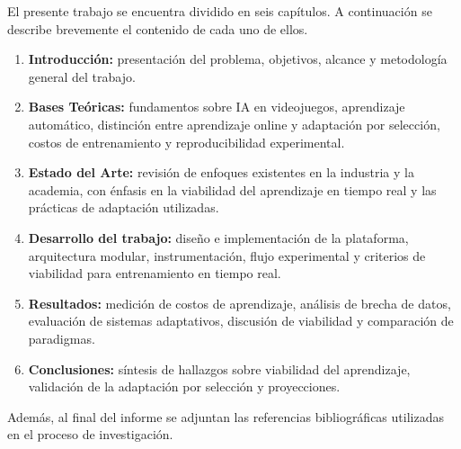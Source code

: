 El presente trabajo se encuentra dividido en seis capítulos. A continuación se describe brevemente el contenido de cada uno de ellos.

\begin{enumerate}
    \item \textbf{Introducción:} presentación del problema, objetivos, alcance y metodología general del trabajo.
    \item \textbf{Bases Teóricas:} fundamentos sobre IA en videojuegos, aprendizaje automático, distinción entre aprendizaje online y adaptación por selección, costos de entrenamiento y reproducibilidad experimental.
    \item \textbf{Estado del Arte:} revisión de enfoques existentes en la industria y la academia, con énfasis en la viabilidad del aprendizaje en tiempo real y las prácticas de adaptación utilizadas.
    \item \textbf{Desarrollo del trabajo:} diseño e implementación de la plataforma, arquitectura modular, instrumentación, flujo experimental y criterios de viabilidad para entrenamiento en tiempo real.
    \item \textbf{Resultados:} medición de costos de aprendizaje, análisis de brecha de datos, evaluación de sistemas adaptativos, discusión de viabilidad y comparación de paradigmas.
    \item \textbf{Conclusiones:} síntesis de hallazgos sobre viabilidad del aprendizaje, validación de la adaptación por selección y proyecciones.
\end{enumerate}

Además, al final del informe se adjuntan las referencias bibliográficas utilizadas en el proceso de investigación.
\vfill